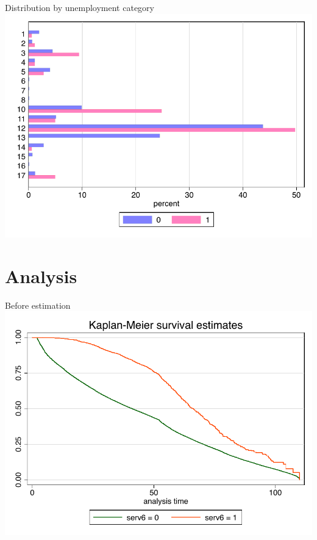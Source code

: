 \documentclass{beamer}
\begin{document}
\begin{frame}{Distribution by unemployment category}
    \includegraphics[scale = 0.7]{images/unem_cat.pdf}
\end{frame}



\section{Analysis}

\begin{frame}{Before estimation}
    \centering
    \includegraphics[scale=0.7]{images/surv_fun.pdf}
\end{frame}
\end{document}
